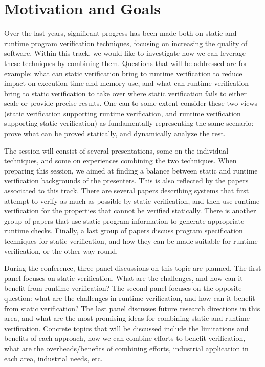 
\section{Motivation and Goals}

Over the last years, significant progress has been made both on static and runtime program verification techniques, focusing on increasing the quality of software. Within this track, we would like to investigate how we can leverage these techniques by combining them. Questions that will be addressed are for example: what can static verification  bring to runtime verification 
to reduce impact on execution time and memory use, and what can runtime verification bring to static verification to take over where static verification fails to either scale or provide precise results. One can to some extent consider these two views (static verification supporting runtime verification, and runtime verification supporting static verification) as fundamentally representing the same scenario: prove what can be proved statically, and dynamically analyze the rest. 

The session will consist of several presentations, some on the individual techniques, and some on experiences combining the two techniques. When preparing this session, we aimed at finding a balance between static and runtime verification backgrounds of the presenters. This is also reflected by the papers associated to this track. There are several papers describing systems that first attempt to verify as much as possible by static verification, and then use runtime verification for the properties that cannot be verified statically. There is another group of papers that use static program information to generate appropriate runtime checks. Finally, a last group of papers discuss program specification techniques for static verification, and how they can be made suitable for runtime verification, or the other way round.

During the conference, three panel discussions on this topic are planned. The first panel focuses on static verification. What are the challenges, and how can it benefit from runtime verification? The second panel focuses on the opposite question: what are the challenges in runtime verification, and how can it benefit from static verification? The last panel  discusses future research directions in this area, and what are the most promising ideas for combining static and runtime verification. Concrete topics that will be discussed include the limitations and benefits of each approach, how we can combine efforts to benefit verification, what are the overheads/benefits of combining efforts, industrial application in each area, industrial needs, etc.



